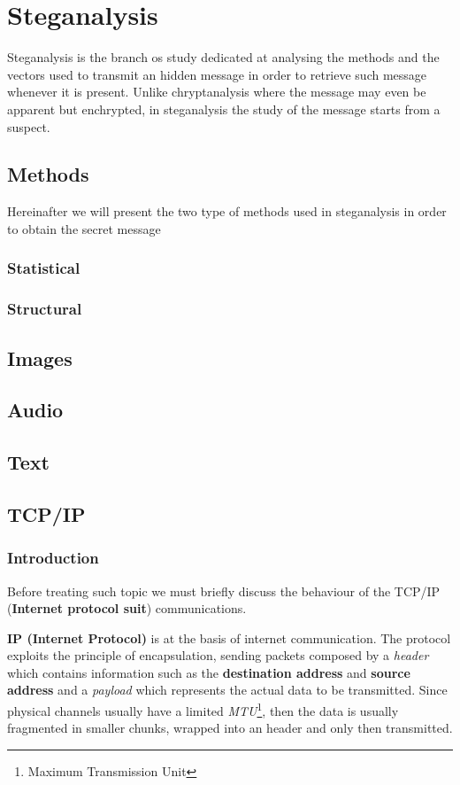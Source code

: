 \documentclass[../../main.tex]{subfiles}
\begin{document}
    
    \section{Steganalysis}
    Steganalysis is the branch os study dedicated at analysing the methods and the vectors used to transmit an hidden message in order to retrieve such message whenever it is present.
    Unlike chryptanalysis where the message may even be apparent but enchrypted, in steganalysis the study of the message starts from a suspect.
    \subsection{Methods}
    Hereinafter we will present the two type of methods used in steganalysis in order to obtain the secret message 

    \subsubsection{Statistical}

    \subsubsection{Structural}
    

    \subsection{Images}


    \subsection{Audio}
    
    
    \subsection{Text}
    
    
    \subsection{TCP/IP}
    \subsubsection{Introduction}
    Before treating such topic we must briefly discuss the behaviour of the TCP/IP (\textbf{Internet protocol suit}) communications.
    
    \textbf{IP (Internet Protocol)} is at the basis of internet communication. The protocol exploits the principle of encapsulation, sending packets composed by a \emph{header} which contains information such as the \textbf{destination address} and \textbf{source address} and a \emph{payload}
    which represents the actual data to be transmitted. Since physical channels usually have a limited \emph{MTU}\footnote{Maximum Transmission Unit}, then the data is usually fragmented in smaller chunks, wrapped into an header and only then transmitted.
    
\end{document}

